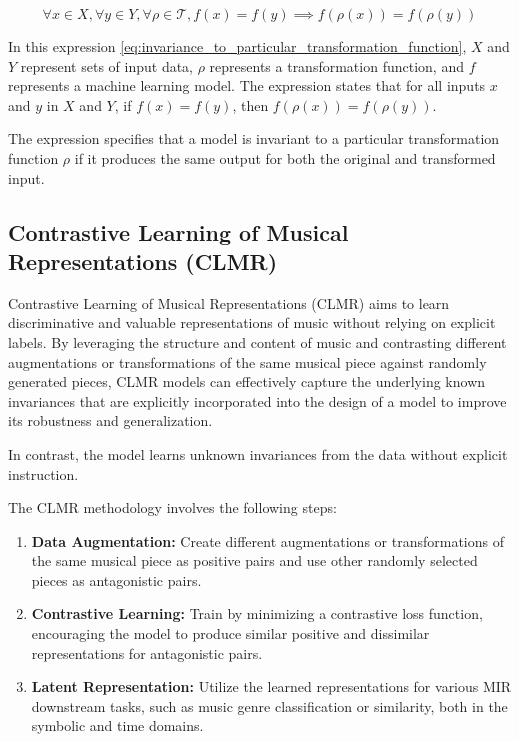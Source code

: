 \begin{equation}
\label{eq:invariance_to_particular_transformation_function}
\forall x \in X, \forall y \in Y, \forall \rho \in \mathcal{T}, f(x) = f(y) \implies f(\rho(x)) = f(\rho(y))
\end{equation}

In this expression \ref{eq:invariance_to_particular_transformation_function}, $X$ and $Y$ represent sets of input data, $\rho$ represents a transformation function, and $f$ represents a machine learning model. The expression states that for all inputs $x$ and $y$ in $X$ and $Y$, if $f(x) = f(y)$, then $f(\rho(x)) = f(\rho(y))$.

The expression specifies that a model is invariant to a particular transformation function $\rho$ if it produces the same output for both the original and transformed input.


\subsection{Contrastive Learning of Musical Representations (CLMR)}

Contrastive Learning of Musical Representations (CLMR) \cite{CLMR2021} aims to learn discriminative and valuable representations of music without relying on explicit labels. By leveraging the structure and content of music and contrasting different augmentations or transformations of the same musical piece against randomly generated pieces, CLMR models can effectively capture the underlying known invariances that are explicitly incorporated into the design of a model to improve its robustness and generalization. 

In contrast, the model learns unknown invariances from the data without explicit instruction.

The CLMR methodology involves the following steps:

\begin{enumerate}
\item \textbf{Data Augmentation:} Create different augmentations or transformations of the same musical piece as positive pairs and use other randomly selected pieces as antagonistic pairs.
\item \textbf{Contrastive Learning:} Train by minimizing a contrastive loss function, encouraging the model to produce similar positive and dissimilar representations for antagonistic pairs.
\item\textbf{Latent Representation:} Utilize the learned representations for various MIR downstream tasks, such as music genre classification or similarity, both in the symbolic and time domains.
\end{enumerate} 


